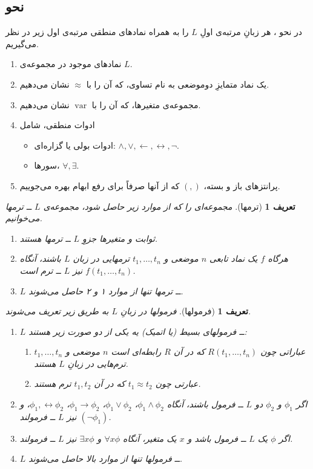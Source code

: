 \documentclass[12pt,a4paper]{article}
\theoremstyle{colorhead}
\newtheorem{defn}[thm]{تعریف}
\DeclareMathOperator{\var}{var}
\begin{document}
\subsection{نحو}
در نحو
،
هر زبانِ مرتبه‌‌ی اولِ
$L$
را به همراه
نمادهای منطقی 
مرتبه‌ی اول زیر 
در نظر می‌گیریم. 
\begin{enumerate}
\item 
نمادهای موجود در 
مجموعه‌ی 
$L$.
\item 
یک نماد متمایزِ دوموضعی به نام تساوی، که آن را با
$\approx$
نشان می‌دهیم.
\item 
 مجموعه‌ی  متغیرها، که آن را با 
$\var$
نشان می‌دهیم.
\item 
ادوات منطقی، شامل 
\begin{itemize}
\item 
ادوات بولی یا گزاره‌ای:
$\wedge,\vee, \leftarrow,\leftrightarrow, \neg$.
\item 
سورها،
$\forall,\exists$.
\end{itemize}
\item 
پرانتزهای باز و بسته، 
$(,)$
که از آنها صرفاً برای رفع ابهام بهره می‌جوییم.
\end{enumerate}
\begin{defn}[ترمها]
مجموعه‌ای را که از موارد زیر حاصل شود، مجموعه‌ی
$L$ ــ
\textit{ترمها}
 می‌خوانیم.
 \begin{enumerate}
 \item 
 ثوابت و متغیرها جزوِ
 $L$ ــ
 ترمها هستند.
 \item 
 هرگاه 
 $f$
 یک نماد تابعی
 $n$
 موضعی  و 
 $t_1,\ldots,t_n$
 ترمهایی در زبان
 $L$
 باشند،‌ آنگاه
 $f(t_1,\ldots,t_n)$
 نیز
 $L$
 ــ
 ترم است.
 \item 
 $L$ ــ
 ترمها تنها از 
 موارد ۱ و ۲ حاصل می‌شوند.
  \end{enumerate}
\end{defn}
\begin{defn}[فرمولها]
فرمولها در زبانِ 
$L$
به طریق زیر تعریف می‌شوند.
\begin{enumerate}
\item 
$L$ ــ
فرمولهای بسیط (یا اتمیک)
یه یکی از دو صورت زیر هستند:
\begin{enumerate}
\item 
عباراتی چون
$R(t_1,\ldots, t_n)$
که در آن
$R$
رابطه‌ای است
$n$
موضعی و 
$t_1,\ldots,t_n$
ترم‌هایی در زبانِ
$L$
هستند.
\item 
عبارتی چون
$t_1\approx t_2$
که در آن
$t_1,t_2$
ترم هستند.
\end{enumerate}
\item 
اگر
$\phi_1$
و
$\phi_2$
دو
$L$ ــ‌ 
فرمول باشند، آنگاه
$\phi_1\wedge \phi_2$،
$\phi_1\vee \phi_2$،
$\phi_1\to \phi_2$،
$\phi_1,\leftrightarrow\phi_2$،
و
$(\neg\phi_1)$
نیز 
$L$ ــ
فرمولند.
\item 
اگر
$\phi$
یک
$L$ ــ‌
فرمول باشد و 
$x$
یک متغیر، آنگاه
$\forall x \phi$
و
$\exists x\phi$
نیز
$L$
ــ فرمولند.
\item 
$L$ ــ
فرمولها تنها از موارد بالا حاصل می‌شوند.
\end{enumerate}
\end{defn}
\end{document}
